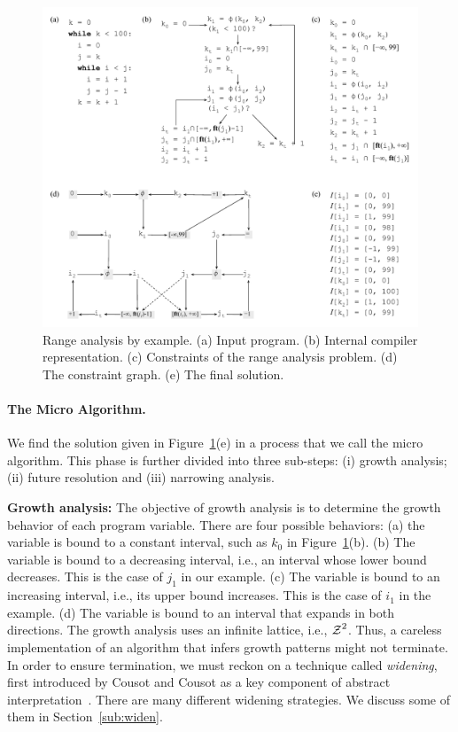 \documentclass{paper}
\newcommand{\varset}[1]{\mbox{$\cal{#1}$}}
\begin{document}
\begin{figure}[t!]
\begin{center}
\includegraphics[width=\textwidth]{images/overall_view}
\end{center}
\caption{\label{fig:overall_view}
Range analysis by example.
(a) Input program.
(b) Internal compiler representation.
(c) Constraints of the range analysis problem.
(d) The constraint graph.
(e) The final solution.}
\end{figure}

\paragraph{The Micro Algorithm.}
We find the solution given in Figure~\ref{fig:overall_view}(e) in a
process that we call the micro algorithm.
This phase is further divided into three sub-steps:
(i) growth analysis;
(ii) future resolution and
(iii) narrowing analysis.

\noindent
\textbf{Growth analysis: }
The objective of growth analysis is to determine the growth behavior of
each program variable.
There are four possible behaviors:
(a) the variable is bound to a constant interval,
such as $k_0$ in Figure~\ref{fig:overall_view}(b).
(b) The variable is bound to a decreasing interval, i.e., an interval whose
lower bound decreases.
This is the case of $j_1$ in our example.
(c) The variable is bound to an increasing interval, i.e., its upper bound
increases.
This is the case of $i_1$ in the example.
(d) The variable is bound to an interval that expands in both directions.
The growth analysis uses an infinite lattice, i.e., $\varset{Z}^2$.
Thus, a careless implementation of an algorithm that infers growth patterns
might not terminate.
In order to ensure termination, we must reckon on a technique called
{\em widening}, first introduced by Cousot and Cousot as a key component
of abstract interpretation~\cite{Cousot77}.
There are many different widening strategies.
We discuss some of them in Section~\ref{sub:widen}.
\end{document}
